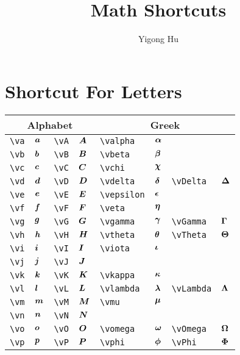 \documentclass{article}
\title{Math Shortcuts}
\author{Yigong Hu}
\date{ }
\begin{document}
\maketitle

\section{Shortcut For Letters}

\begin{table}[h]
    \centering
    \begin{tabular}{ll|ll|ll|ll}\toprule
    \multicolumn{4}{c|}{\textbf{Alphabet}} & \multicolumn{4}{c}{\textbf{Greek}} \\\midrule
    \verb"\va" & $\bm{a}$ & \verb"\vA" & $\bm{A}$ & \verb"\valpha" & $\bm{\alpha}$ & \\
    \verb"\vb" & $\bm{b}$ & \verb"\vB" & $\bm{B}$ & \verb"\vbeta" & $\bm{\beta}$ & \\
    \verb"\vc" & $\bm{c}$ & \verb"\vC" & $\bm{C}$ & \verb"\vchi" & $\bm{\chi}$ & \\
    \verb"\vd" & $\bm{d}$ & \verb"\vD" & $\bm{D}$ & \verb"\vdelta" & $\bm{\delta}$ & \verb"\vDelta" & $\bm{\Delta}$ \\
    \verb"\ve" & $\bm{e}$ & \verb"\vE" & $\bm{E}$ & \verb"\vepsilon" & $\bm{\epsilon}$ & \\
    \verb"\vf" & $\bm{f}$ & \verb"\vF" & $\bm{F}$ & \verb"\veta" & $\bm{\eta}$ & \\
    \verb"\vg" & $\bm{g}$ & \verb"\vG" & $\bm{G}$ & \verb"\vgamma" & $\bm{\gamma}$ & \verb"\vGamma" & $\bm{\Gamma}$ \\
    \verb"\vh" & $\bm{h}$ & \verb"\vH" & $\bm{H}$ & \verb"\vtheta" & $\bm{\theta}$ & \verb"\vTheta" & $\bm{\Theta}$ \\
    \verb"\vi" & $\bm{i}$ & \verb"\vI" & $\bm{I}$ & \verb"\viota" & $\bm{\iota}$ & \\
    \verb"\vj" & $\bm{j}$ & \verb"\vJ" & $\bm{J}$ & & \\
    \verb"\vk" & $\bm{k}$ & \verb"\vK" & $\bm{K}$ & \verb"\vkappa" & $\bm{\kappa}$ & \\
    \verb"\vl" & $\bm{l}$ & \verb"\vL" & $\bm{L}$ & \verb"\vlambda" & $\bm{\lambda}$ & \verb"\vLambda" & $\bm{\Lambda}$ \\
    \verb"\vm" & $\bm{m}$ & \verb"\vM" & $\bm{M}$ & \verb"\vmu" & $\bm{\mu}$ & \\
    \verb"\vn" & $\bm{n}$ & \verb"\vN" & $\bm{N}$ & & \\
    \verb"\vo" & $\bm{o}$ & \verb"\vO" & $\bm{O}$ & \verb"\vomega" & $\bm{\omega}$ & \verb"\vOmega" & $\bm{\Omega}$ \\
    \verb"\vp" & $\bm{p}$ & \verb"\vP" & $\bm{P}$ & \verb"\vphi" & $\bm{\phi}$ & \verb"\vPhi" & $\bm{\Phi}$ \\

\end{tabular}
\end{table}
\end{document}
